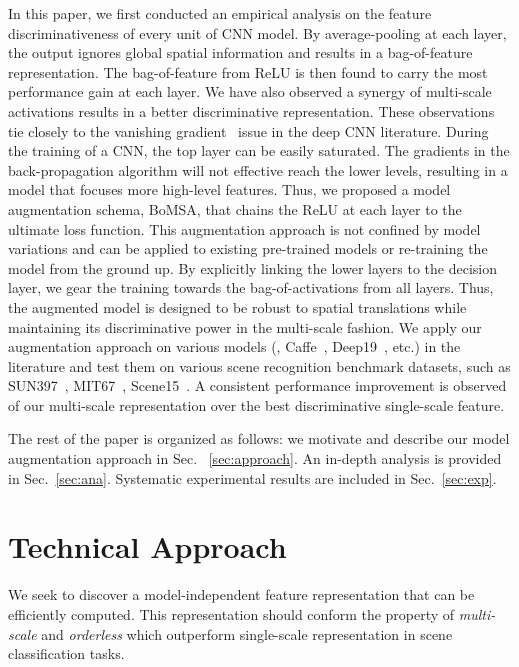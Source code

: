 \documentclass[10pt,twocolumn,letterpaper]{article}
\begin{document}
In this paper, we first conducted an empirical analysis on the feature discriminativeness of every unit of CNN model. By average-pooling at each layer, the output ignores global spatial information and results in a bag-of-feature representation. The bag-of-feature from ReLU is then found to carry the most performance gain at each layer. We have also observed a synergy of multi-scale activations results in a better discriminative representation. These observations tie closely to the vanishing gradient~\cite{diff_cnn} issue in the deep CNN literature. During the training of a CNN, the top layer can be easily saturated. The gradients in the back-propagation algorithm will not effective reach the lower levels, resulting in a model that focuses more high-level features. Thus, we proposed a model augmentation schema, BoMSA, that chains the ReLU at each layer to the ultimate loss function. This augmentation approach is not confined by model variations and can be applied to existing pre-trained models or re-training the model from the ground up. By explicitly linking the lower layers to the decision layer, we gear the training towards the bag-of-activations from all layers. Thus, the augmented model is designed to be robust to spatial translations while maintaining its discriminative power in the multi-scale fashion. We apply our augmentation approach on various models (\eg, Caffe~\cite{Caffe}, Deep19~\cite{veryDeep}, etc.) in the literature and test them on various scene recognition benchmark datasets, such as SUN397~\cite{SUN397}, MIT67~\cite{MIT67}, Scene15~\cite{Scene15}. A consistent performance improvement is observed of our multi-scale representation over the best discriminative single-scale feature. 

The rest of the paper is organized as follows: we motivate and describe our model augmentation approach in Sec.~
\ref{sec:approach}. An in-depth analysis is provided in Sec.~\ref{sec:ana}. Systematic experimental results are included in Sec.~\ref{sec:exp}. 


\section{Technical Approach\label{sec:approach}}

We seek to discover a model-independent feature representation that can be efficiently computed. This representation should conform the property of \textit{multi-scale} and \textit{orderless} which outperform single-scale representation in scene classification tasks. 
\end{document}
